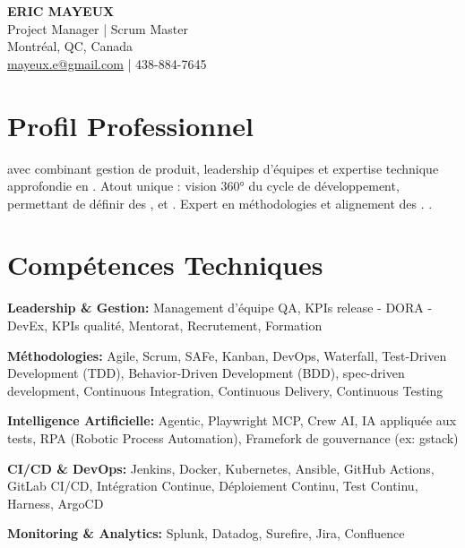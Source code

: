 \documentclass[11pt,a4paper]{article}
\begin{document}
\begin{center}
    {\LARGE \textbf{ERIC MAYEUX}}\\
    \vspace{4pt}
    {\large Project Manager | Scrum Master}\\
    \vspace{4pt}
    Montréal, QC, Canada\\
    \href{mailto:mayeux.e@gmail.com}{mayeux.e@gmail.com} | 438-884-7645
\end{center}

\vspace{8pt}

\section*{Profil Professionnel}
\noindent
{} avec  combinant gestion de produit, leadership d'équipes et expertise technique approfondie en . Atout unique : vision 360° du cycle de développement, permettant de définir des ,  et . Expert en méthodologies  et alignement des . .

\section*{Compétences Techniques}

\textbf{Leadership \& Gestion:} Management d'équipe QA, KPIs release - DORA - DevEx, KPIs qualité, Mentorat, Recrutement, Formation

\textbf{Méthodologies:} Agile, Scrum, SAFe, Kanban, DevOps, Waterfall, Test-Driven Development (TDD), Behavior-Driven Development (BDD), spec-driven development, Continuous Integration, Continuous Delivery, Continuous Testing

\textbf{Intelligence Artificielle:} Agentic, Playwright MCP, Crew AI, IA appliquée aux tests, RPA (Robotic Process Automation), Framefork de gouvernance (ex: gstack)

\textbf{CI/CD \& DevOps:} Jenkins, Docker, Kubernetes, Ansible, GitHub Actions, GitLab CI/CD, Intégration Continue, Déploiement Continu, Test Continu, Harness, ArgoCD

\textbf{Monitoring \& Analytics:} Splunk, Datadog, Surefire, Jira, Confluence
\end{document}
